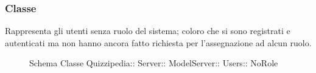 \subsubsection{Classe }
Rappresenta gli utenti senza ruolo del sistema; coloro che si sono registrati e autenticati ma non hanno ancora fatto richiesta per l'assegnazione ad alcun ruolo.
\begin{figure}[H]
\centering
\noindent{}
\caption[Schema Classe NoRole]{Schema Classe Quizzipedia:: Server:: ModelServer:: Users:: NoRole}
\end{figure}
